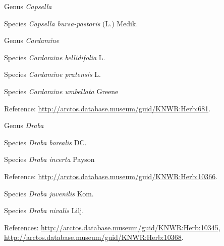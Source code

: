\documentclass[9pt, article]{memoir}
\begin{document}
\begin{multicols}{2}
\vspace{6pt}\noindent\hspace{30pt}Genus \textit{Capsella}


\vspace{6pt}\noindent\hspace{36pt}Species \textit{Capsella bursa-pastoris} (L.) Medik.


\vspace{6pt}\noindent\hspace{30pt}Genus \textit{Cardamine}


\vspace{6pt}\noindent\hspace{36pt}Species \textit{Cardamine bellidifolia} L.


\vspace{6pt}\noindent\hspace{36pt}Species \textit{Cardamine pratensis} L.


\vspace{6pt}\noindent\hspace{36pt}Species \textit{Cardamine umbellata} Greene


\vspace{6pt}Reference: 
\url{http://arctos.database.museum/guid/KNWR:Herb:681}.

\vspace{6pt}\noindent\hspace{30pt}Genus \textit{Draba}


\vspace{6pt}\noindent\hspace{36pt}Species \textit{Draba borealis} DC.


\vspace{6pt}\noindent\hspace{36pt}Species \textit{Draba incerta} Payson


\vspace{6pt}Reference: 
\url{http://arctos.database.museum/guid/KNWR:Herb:10366}.

\vspace{6pt}\noindent\hspace{36pt}Species \textit{Draba juvenilis} Kom.


\vspace{6pt}\noindent\hspace{36pt}Species \textit{Draba nivalis} Lilj.


\vspace{6pt}References: 
\url{http://arctos.database.museum/guid/KNWR:Herb:10345}, 
\url{http://arctos.database.museum/guid/KNWR:Herb:10368}.


\end{multicols}
\end{document}
